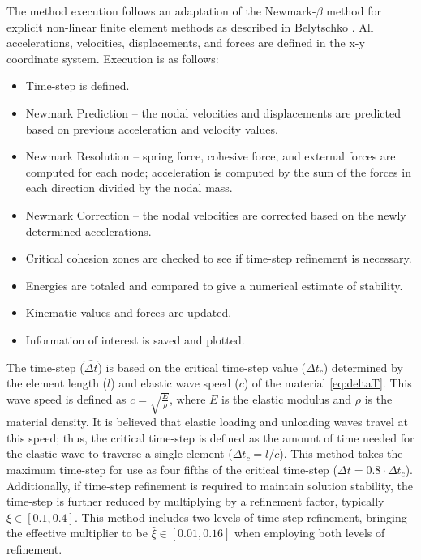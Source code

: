 \documentclass[12pt,a4paper]{article}
\begin{document}
The method execution follows an adaptation of the Newmark-$\beta$ method for explicit non-linear finite element methods as described in Belytschko \cite{Belytschko2000}. All accelerations, velocities, displacements, and forces are defined in the x-y coordinate system. Execution is as follows:
\begin{itemize}
\item Time-step is defined.

\item Newmark Prediction – the nodal velocities and displacements are predicted based on previous acceleration and velocity values.

\item Newmark Resolution – spring force, cohesive force, and external forces are computed for each node; acceleration is computed by the sum of the forces in each direction divided by the nodal mass.

\item Newmark Correction – the nodal velocities are corrected based on the newly determined accelerations.

\item Critical cohesion zones are checked to see if time-step refinement is necessary.

\item Energies are totaled and compared to give a numerical estimate of stability.

\item Kinematic values and forces are updated.

\item Information of interest is saved and plotted.
\end{itemize}
The time-step ($\hat{\Delta t}$) is based on the critical time-step value ($\Delta t_{c}$) determined by the element length ($l$) and elastic wave speed ($c$) of the material \eqref{eq:deltaT}. This wave speed is defined as $c = \sqrt{\frac{E}{\rho}}$, where $E$ is the elastic modulus and $\rho$ is the material density. It is believed that elastic loading and unloading waves travel at this speed; thus, the critical time-step is defined as the amount of time needed for the elastic wave to traverse a single element ($\Delta t_{c} = l / c$). This method takes the maximum time-step for use as four fifths of the critical time-step ($\Delta t = 0.8 \cdot \Delta t_{c}$). Additionally, if time-step refinement is required to maintain solution stability, the time-step is further reduced by multiplying by a refinement factor, typically $\xi \in [0.1,0.4]$. This method includes two levels of time-step refinement, bringing the effective multiplier to be $\hat{\xi} \in [0.01,0.16]$ when employing both levels of refinement.
\end{document}
